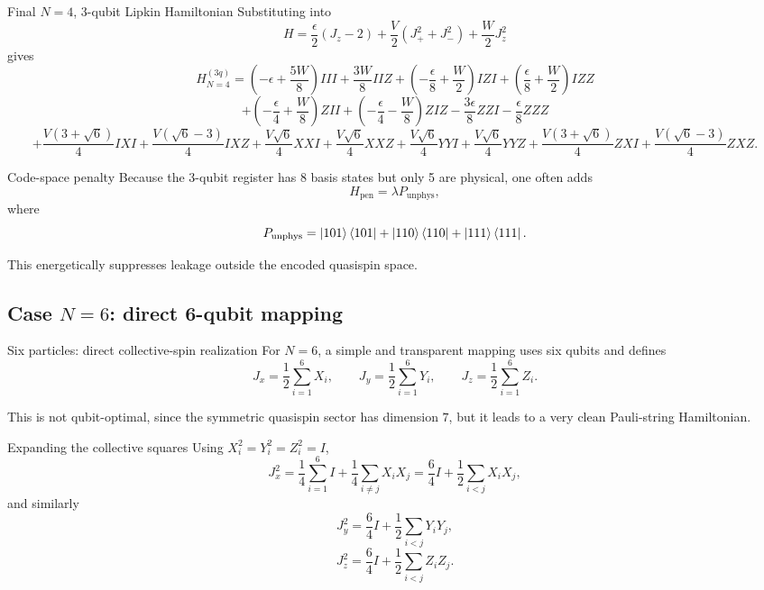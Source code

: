 \documentclass[aspectratio=169]{beamer}
\begin{document}
\begin{frame}{Final \(N=4\), 3-qubit Lipkin Hamiltonian}
Substituting into
\[
H = \frac{\epsilon}{2}(J_z-2) + \frac{V}{2}(J_+^2+J_-^2) + \frac{W}{2}J_z^2
\]
gives
\[
H_{N=4}^{(3q)}
=
\left(-\epsilon+\frac{5W}{8}\right)III
+\frac{3W}{8}IIZ
+\left(-\frac{\epsilon}{8}+\frac{W}{2}\right)IZI
+\left(\frac{\epsilon}{8}+\frac{W}{2}\right)IZZ
\]
\[
+\left(-\frac{\epsilon}{4}+\frac{W}{8}\right)ZII
+\left(-\frac{\epsilon}{4}-\frac{W}{8}\right)ZIZ
-\frac{3\epsilon}{8}ZZI
-\frac{\epsilon}{8}ZZZ
\]
\[
+\frac{V(3+\sqrt{6})}{4}IXI
+\frac{V(\sqrt{6}-3)}{4}IXZ
+\frac{V\sqrt{6}}{4}XXI
+\frac{V\sqrt{6}}{4}XXZ
+\frac{V\sqrt{6}}{4}YYI
+\frac{V\sqrt{6}}{4}YYZ
+\frac{V(3+\sqrt{6})}{4}ZXI
+\frac{V(\sqrt{6}-3)}{4}ZXZ.
\]
\end{frame}

\begin{frame}{Code-space penalty}
Because the 3-qubit register has 8 basis states but only 5 are physical, one often adds
\[
H_{\mathrm{pen}} = \lambda P_{\mathrm{unphys}},
\]
where
\[
P_{\mathrm{unphys}}
=
\ket{101}\bra{101}
+\ket{110}\bra{110}
+\ket{111}\bra{111}.
\]

This energetically suppresses leakage outside the encoded quasispin space.
\end{frame}

\subsection{Case \(N=6\): direct 6-qubit mapping}

\begin{frame}{Six particles: direct collective-spin realization}
For \(N=6\), a simple and transparent mapping uses six qubits and defines
\[
J_x = \frac{1}{2}\sum_{i=1}^{6} X_i,
\qquad
J_y = \frac{1}{2}\sum_{i=1}^{6} Y_i,
\qquad
J_z = \frac{1}{2}\sum_{i=1}^{6} Z_i.
\]

This is not qubit-optimal, since the symmetric quasispin sector has dimension \(7\), but it leads to a very clean Pauli-string Hamiltonian.
\end{frame}

\begin{frame}{Expanding the collective squares}
Using \(X_i^2=Y_i^2=Z_i^2=I\),
\[
J_x^2
=
\frac{1}{4}\sum_{i=1}^{6} I
+
\frac{1}{4}\sum_{i\neq j} X_iX_j
=
\frac{6}{4}I + \frac{1}{2}\sum_{i<j} X_iX_j,
\]
and similarly
\[
J_y^2
=
\frac{6}{4}I + \frac{1}{2}\sum_{i<j} Y_iY_j,
\]
\[
J_z^2
=
\frac{6}{4}I + \frac{1}{2}\sum_{i<j} Z_iZ_j.
\]
\end{frame}
\end{document}
